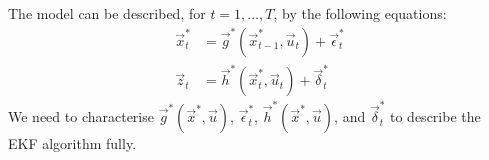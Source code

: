 The model can be described, for $t = 1, \dotsc, T$, by the following equations:
\begin{align}
	\vec x_t^\ast 	&= \vec g^\ast(\vec x_{t - 1}^\ast, \vec u_t) + \vec \epsilon_t^\ast \\
	\vec z_t 		&= \vec h^\ast(\vec x_t^\ast, \vec u_t) + \vec \delta_t^\ast
\end{align}
We need to characterise $\vec g^\ast(\vec x^\ast, \vec u)$, $\vec \epsilon_t^\ast$, $\vec h^\ast(\vec x^\ast, \vec u)$, and $\vec \delta_t^\ast$ to describe the EKF algorithm fully.

